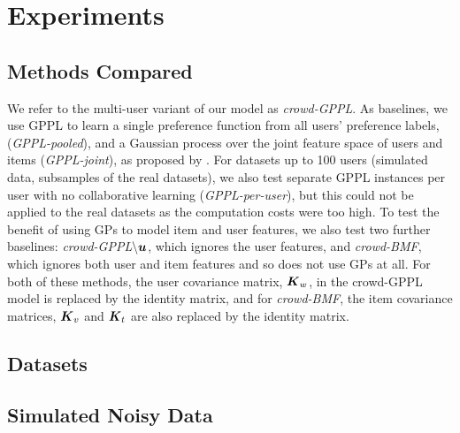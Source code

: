 \section{Experiments}\label{sec:expts}


\subsection{Methods Compared}

We refer to the multi-user variant of our model as \emph{crowd-GPPL}.
As baselines, we use GPPL to learn a single preference function from all users' preference labels, (\emph{GPPL-pooled}), and a Gaussian process over the joint feature space of users and items 
(\emph{GPPL-joint}), as proposed by \citet{guo2010gaussian}.
For datasets up to 100 users (simulated data, subsamples of the real datasets), 
we also test separate GPPL instances per user with no collaborative
learning (\emph{GPPL-per-user}), but this could not be applied to the real datasets as the 
computation costs were too high.
To test the benefit of using GPs to model item and user features,
we also test two further baselines: 
\emph{crowd-GPPL$\mathbf{\setminus \boldsymbol u}$}, which ignores the user features,
and \emph{crowd-BMF}, which ignores both user and item features and so does not use GPs at all. 
For both of these methods, the user covariance matrix, $\boldsymbol K_w$, in the crowd-GPPL model is replaced by the identity matrix, and for \emph{crowd-BMF}, the item covariance matrices, $\boldsymbol K_v$ and $\boldsymbol K_t$ are also replaced by the identity matrix.



\subsection{Datasets}

\subsection{Simulated Noisy Data}\label{sec:exp_synth}

